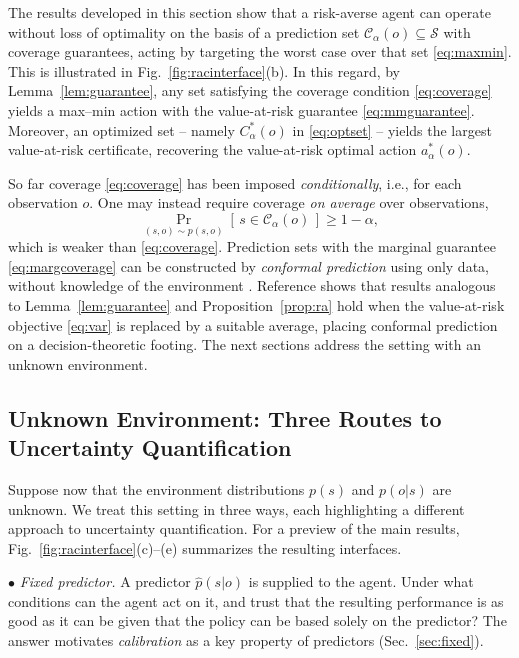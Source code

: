 \documentclass[journal]{IEEEtran}
\theoremstyle{definition}
\theoremstyle{remark}
\newcommand{\Sset}{\mathcal{S}}
\begin{document}
The results developed in this section show that  a risk-{averse} agent can operate without loss of optimality on the basis of a {prediction set}
$\mathcal{C}_{\alpha}(o)\subseteq\Sset$ with coverage guarantees, acting by targeting the worst case over that set \eqref{eq:maxmin}. This is illustrated in Fig.~\ref{fig:racinterface}(b). In this regard, by Lemma~\ref{lem:guarantee}, any set satisfying the coverage condition \eqref{eq:coverage} yields a
max--min action with the value-at-risk guarantee \eqref{eq:mmguarantee}. Moreover, an optimized  set
-- namely $C_\alpha^*(o)$ in \eqref{eq:optset} -- yields the largest value-at-risk certificate, 
recovering the value-at-risk optimal action $a_\alpha^*(o)$.

So far coverage \eqref{eq:coverage} has been imposed \emph{conditionally},
i.e., for each observation $o$. One may instead require coverage \emph{on
average} over observations,
\begin{equation}
\label{eq:margcoverage}
\Pr_{(s,o)\sim p(s,o)}\!\left[\,s\in \mathcal{C}_{\alpha}(o)\,\right]\ge 1-\alpha,
\end{equation}
which is weaker than \eqref{eq:coverage}. Prediction sets with the marginal
guarantee \eqref{eq:margcoverage} can be constructed by \emph{conformal
prediction} using only data, without knowledge of the environment 
\cite{vovk2005algorithmic,angelopoulos2023gentle}. Reference
\cite{kiyani2025conformal} shows that results analogous to
Lemma~\ref{lem:guarantee} and Proposition~\ref{prop:ra} hold when the
value-at-risk objective \eqref{eq:var} is replaced by a suitable average,
placing conformal prediction on a decision-theoretic footing. The next sections address the setting with an unknown environment.

\subsection{Unknown Environment: Three Routes to Uncertainty Quantification}
\label{sec:unknown}
Suppose now that the environment distributions $p(s)$ and $p(o| s)$ are unknown. We treat this setting in three ways,
each highlighting a different approach to uncertainty quantification. For a preview of the main results, 
Fig.~\ref{fig:racinterface}(c)--(e) summarizes the resulting interfaces.

\noindent $\bullet$  \emph{Fixed predictor.} A predictor $\hat{p}(s| o)$ is supplied to the agent.
Under what conditions can the agent act on it, and
trust that the resulting performance is as good as it can be given that the policy can be based solely on the predictor? The answer motivates \emph{calibration} as a key property of predictors 
(Sec.~\ref{sec:fixed}).
\end{document}
